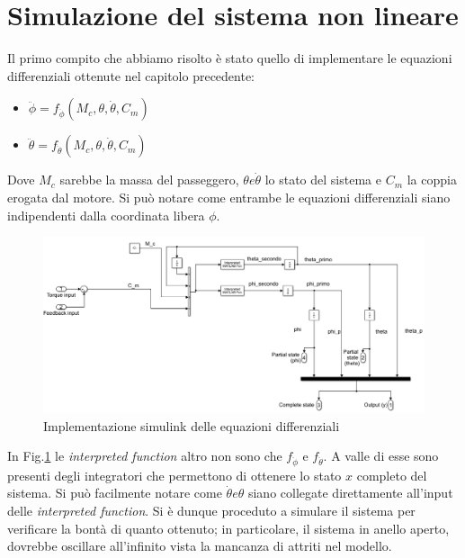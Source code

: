 \section{Simulazione del sistema non lineare}

Il primo compito che abbiamo risolto è stato quello di implementare le equazioni differenziali ottenute nel capitolo precedente:
\begin{itemize}
	\item $\ddot{\phi} = f_{\ddot{\phi}} (M_c,\theta,\dot{\theta},C_m)$
	\item $\ddot{\theta} = f_{\ddot{\theta}} (M_c,\theta,\dot{\theta},C_m)$
\end{itemize}

Dove $M_c$ sarebbe la massa del passeggero, $\theta e \dot{\theta}$ lo stato del sistema e $C_m$  la coppia erogata dal motore. Si può notare come entrambe le equazioni differenziali siano indipendenti dalla coordinata libera $\phi$.
\begin{figure}[H]
	\centering   	
	\includegraphics[width=1\textwidth]{Immagini/non_linear_system.png}
	\caption{Implementazione simulink delle equazioni differenziali}
	\label{fig:non_linear_system}
\end{figure}
In Fig.\ref{fig:non_linear_system} le \textit{interpreted function} altro non sono che  $f_{\ddot{\phi}}$ e $f_{\ddot{\theta}}$. A valle di esse sono presenti degli integratori che permettono di ottenere lo stato $x$ completo del sistema. Si può facilmente notare come $\dot{\theta} e \theta$ siano collegate direttamente all'input delle \textit{interpreted function}.
Si è dunque proceduto a  simulare il sistema per verificare la bontà di quanto ottenuto; in particolare, il sistema in anello aperto, dovrebbe oscillare all'infinito vista la mancanza di attriti nel modello.


